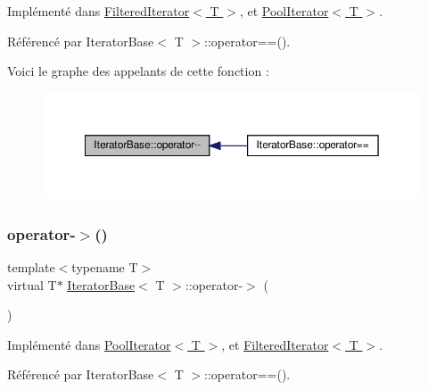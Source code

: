 Implémenté dans \hyperlink{class_filtered_iterator_a860a37fdf31e87a96b80cb295e6d34c2}{Filtered\+Iterator$<$ T $>$}, et \hyperlink{class_pool_iterator_aa1f588a47b0c11d6e064e34b129337ae}{Pool\+Iterator$<$ T $>$}.



Référencé par Iterator\+Base$<$ T $>$\+::operator==().

Voici le graphe des appelants de cette fonction \+:\nopagebreak
\begin{figure}[H]
\begin{center}
\leavevmode
\includegraphics[width=350pt]{class_iterator_base_aa9bf0f75a8bb7e4d416a9b88ccacd9c7_icgraph}
\end{center}
\end{figure}
\mbox{\label{class_iterator_base_aad2254f7877e4647f699ceb455e893ff}} 
\subsubsection{\texorpdfstring{operator-\/$>$()}{operator->()}\hspace{0.1cm}{\footnotesize\ttfamily [1/2]}}
{\footnotesize\ttfamily template$<$typename T$>$ \\
virtual T$\ast$ \hyperlink{class_iterator_base}{Iterator\+Base}$<$ T $>$\+::operator-\/$>$ (\begin{DoxyParamCaption}{ }\end{DoxyParamCaption})\hspace{0.3cm}{\ttfamily [pure virtual]}}



Implémenté dans \hyperlink{class_pool_iterator_ae2893041831d8c29f222af7fe184fe09}{Pool\+Iterator$<$ T $>$}, et \hyperlink{class_filtered_iterator_a413726d7cc9a951d0a30eaee6cf36de1}{Filtered\+Iterator$<$ T $>$}.



Référencé par Iterator\+Base$<$ T $>$\+::operator==().

